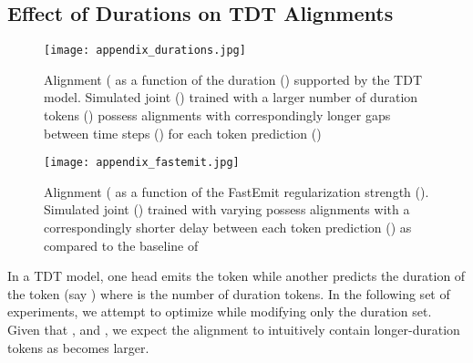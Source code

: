 \documentclass{article}
\begin{document}
\subsection{Effect of Durations on TDT Alignments}
\label{sec:durations_tdt}

\begin{figure} [t]
    \centering
    \begin{minipage}{0.45\textwidth}
        \centering
        \texttt{[image: appendix\_durations.jpg]}
        \caption{Alignment ( as a function of the duration () supported by the TDT model. Simulated joint () trained with a larger number of duration tokens () possess alignments with correspondingly longer gaps between time steps () for each token prediction ()}
       \label{fig:appendix_durations}
    \end{minipage}\hfill
    \begin{minipage}{0.45\textwidth}
        \centering
        \texttt{[image: appendix\_fastemit.jpg]} 
        \caption{Alignment ( as a function of the FastEmit regularization strength (). Simulated joint () trained with varying  possess alignments with a correspondingly shorter delay between each token prediction () as compared to the baseline of }
        \label{fig:appendix_fastemit}
    \end{minipage}
\end{figure}

\iffalse {
\begin{figure}[b]
\centering
    \texttt{[image: appendix\_durations.jpg]}
    \caption{Alignment ( as a function of the duration () supported by the TDT model. Simulated joint () trained with a larger number of duration tokens () possess alignments with correspondingly longer gaps between time steps () for each token prediction ()}
    \label{fig:appendix_durations}
\end{figure}

\begin{figure}[h!]
    \centering
    \texttt{[image: appendix\_fastemit.jpg]}
    \caption{Alignment ( as a function of the FastEmit regularization strength (). Simulated joint () trained with varying  possess alignments with a correspondingly shorter delay between each token prediction () as compared to the baseline of }
    \label{fig:appendix_fastemit}
\end{figure}
} \fi

In a TDT model, one head emits the token while another predicts the duration of the token (say ) where  is the number of duration tokens. In the following set of experiments, we attempt to optimize   while modifying only the duration set. Given that , and , we expect the alignment to intuitively contain longer-duration tokens as  becomes larger.
\end{document}

